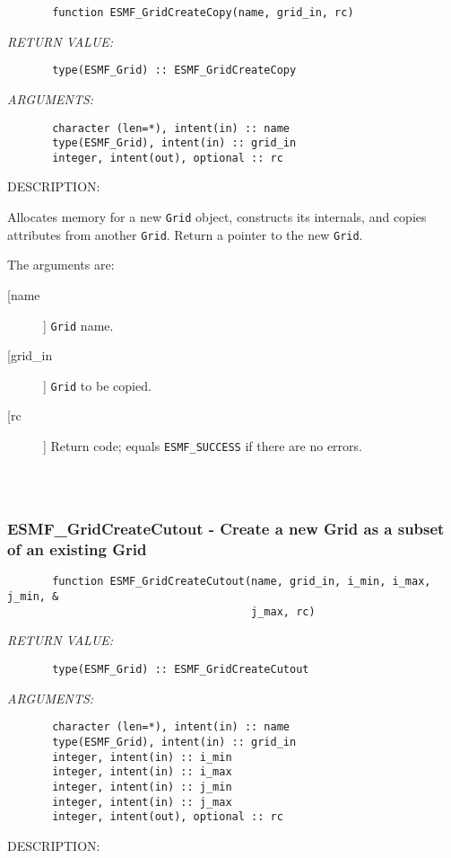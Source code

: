 {
\begin{verbatim}       function ESMF_GridCreateCopy(name, grid_in, rc)\end{verbatim}{\em RETURN VALUE:}
\begin{verbatim}       type(ESMF_Grid) :: ESMF_GridCreateCopy\end{verbatim}{\em ARGUMENTS:}
\begin{verbatim}       character (len=*), intent(in) :: name
       type(ESMF_Grid), intent(in) :: grid_in
       integer, intent(out), optional :: rc               \end{verbatim}
{\sf DESCRIPTION:\\ }


       Allocates memory for a new {\tt Grid} object, constructs its
       internals, and copies attributes from another {\tt Grid}.  Return a
       pointer to the new {\tt Grid}.
  
       The arguments are:
       \begin{description}
       \item[[name]] 
            {\tt Grid} name.
       \item[[grid\_in]] 
            {\tt Grid} to be copied.
       \item[[rc]] 
            Return code; equals {\tt ESMF\_SUCCESS} if there are no errors.
     \end{description}
  
\begin{verbatim} \end{verbatim}
 
 
\mbox{}\hrulefill\ 
 
\subsubsection{ESMF\_GridCreateCutout - Create a new Grid as a subset of an existing Grid}


\begin{verbatim}       function ESMF_GridCreateCutout(name, grid_in, i_min, i_max, j_min, &
                                      j_max, rc)\end{verbatim}{\em RETURN VALUE:}
\begin{verbatim}       type(ESMF_Grid) :: ESMF_GridCreateCutout\end{verbatim}{\em ARGUMENTS:}
\begin{verbatim}       character (len=*), intent(in) :: name
       type(ESMF_Grid), intent(in) :: grid_in
       integer, intent(in) :: i_min                       
       integer, intent(in) :: i_max                       
       integer, intent(in) :: j_min                       
       integer, intent(in) :: j_max                       
       integer, intent(out), optional :: rc               \end{verbatim}
{\sf DESCRIPTION:\\ }


}
